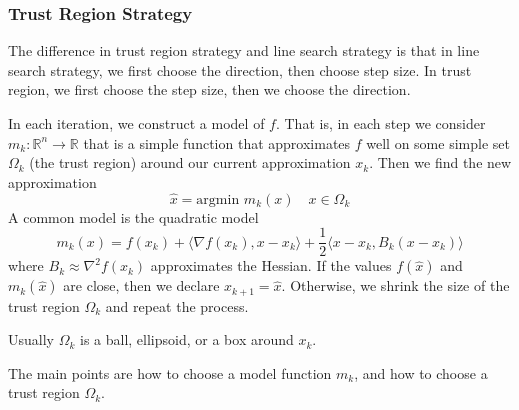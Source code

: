 \subsubsection*{Trust Region Strategy}
The difference in trust region strategy and line search strategy is that in line search strategy, we first choose the direction, then choose step size. In trust region, we first choose the step size, then we choose the direction.
\begin{definition}
  In each iteration, we construct a model of $f$. That is, in each step we consider $m_k: \mathbb R^n \to \mathbb R$ that is a simple function that approximates $f$ well on some simple set $\Omega_k$ (the trust region) around our current approximation $x_k$. Then we find the new approximation $$\hat x = \text{argmin } m_k(x) \quad \text{$x \in \Omega_k$}$$
  A common model is the quadratic model $$m_k(x) = f(x_k) + \langle \nabla f(x_k), x - x_k \rangle + \frac{1}{2} \langle x - x_k, B_k(x - x_k) \rangle$$ where $B_k \approx \nabla^2 f(x_k)$ approximates the Hessian. If the values $f(\hat x)$ and $m_k(\hat x)$ are close, then we declare $x_{k+1} = \hat x$. Otherwise, we shrink the size of the trust region $\Omega_k$ and repeat the process.

  Usually $\Omega_k$ is a ball, ellipsoid, or a box around $x_k$.

  The main points are how to choose a model function $m_k$, and how to choose a trust region $\Omega_k$.
\end{definition}

